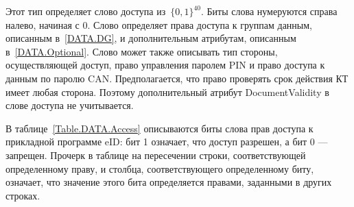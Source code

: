 Этот тип определяет слово доступа из~$\{0,1\}^{40}$. 
Биты слова нумеруются справа налево, начиная с 0. 
Слово определяет права доступа к группам данным, описанным в~\ref{DATA.DG}, 
и дополнительным атрибутам, описанным в~\ref{DATA.Optional}. 
Слово может также описывать тип стороны, осуществляющей доступ, право 
управления паролем PIN и право доступа к данным по паролю CAN. 
Предполагается, что право проверять срок действия КТ имеет любая сторона. 
Поэтому дополнительный атрибут DocumentValidity в слове доступа не 
учитывается. 

В таблице~\ref{Table.DATA.Access} описываются биты слова прав 
доступа к прикладной программе eID: бит 1 означает,
что доступ разрешен, а бит 0 --- запрещен.
Прочерк в таблице 
на пересечении строки, соответствующей определенному праву, и столбца, 
соответствующего определенному биту, означает, что значение этого бита 
определяется правами, заданными в других строках.  

